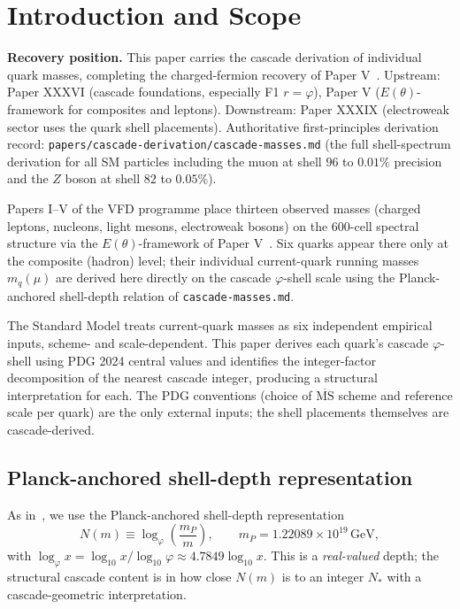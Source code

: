 \documentclass[12pt]{article}
\theoremstyle{definition}
\theoremstyle{remark}
\newcommand{\MSbar}{\overline{\mathrm{MS}}}
\begin{document}
\section{Introduction and Scope}\label{sec:intro}

\textbf{Recovery position.} This paper carries the cascade derivation of individual quark masses, completing the charged-fermion recovery of Paper V~\citep{SmartV}. Upstream: Paper XXXVI (cascade foundations, especially F1 $r = \varphi$), Paper V ($E(\theta)$-framework for composites and leptons). Downstream: Paper XXXIX (electroweak sector uses the quark shell placements). Authoritative first-principles derivation record: \texttt{papers/cascade-derivation/cascade-masses.md} (the full shell-spectrum derivation for all SM particles including the muon at shell $96$ to $0.01\%$ precision and the $Z$ boson at shell $82$ to $0.05\%$).

Papers I--V of the VFD programme place thirteen observed masses (charged leptons, nucleons, light mesons, electroweak bosons) on the 600-cell spectral structure via the $E(\theta)$-framework of Paper V~\citep{SmartV}. Six quarks appear there only at the composite (hadron) level; their individual current-quark running masses $m_q(\mu)$ are derived here directly on the cascade $\varphi$-shell scale using the Planck-anchored shell-depth relation of \texttt{cascade-masses.md}.

The Standard Model treats current-quark masses as six independent empirical inputs, scheme- and scale-dependent. This paper derives each quark's cascade $\varphi$-shell using PDG 2024 central values and identifies the integer-factor decomposition of the nearest cascade integer, producing a structural interpretation for each. The PDG conventions (choice of $\MSbar$ scheme and reference scale per quark) are the only external inputs; the shell placements themselves are cascade-derived.

\subsection{Planck-anchored shell-depth representation}

As in~\citep{SmartXXXVII}, we use the Planck-anchored shell-depth representation
\begin{equation}\label{eq:shell-depth}
N(m) \equiv \log_\varphi\!\left(\frac{m_P}{m}\right), \qquad m_P = 1.22089 \times 10^{19}\,\mathrm{GeV},
\end{equation}
with $\log_\varphi x = \log_{10} x / \log_{10} \varphi \approx 4.7849 \log_{10} x$. This is a \emph{real-valued} depth; the structural cascade content is in how close $N(m)$ is to an integer $N_*$ with a cascade-geometric interpretation.
\end{document}
